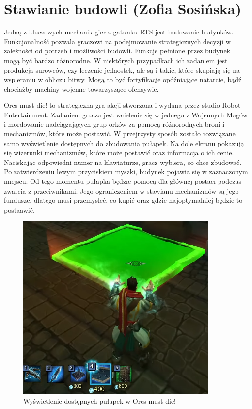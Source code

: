 \section{Stawianie budowli (Zofia Sosińska)}\label{chap:omd}
Jedną z kluczowych mechanik gier z gatunku RTS jest budowanie budynków. Funkcjonalność pozwala graczowi 
na podejmowanie strategicznych decyzji w zależności od potrzeb i możliwości budowli. Funkcje pełnione 
przez budynek mogą być bardzo różnorodne. W niektórych przypadkach ich zadaniem jest produkcja surowców, czy leczenie
jednostek, ale są i takie, które skupiają się na wspieraniu w obliczu bitwy. Mogą to być fortyfikacje opóźniające natarcie,
bądź chociażby machiny wojenne towarzyszące ofensywie.

Orcs must die! to strategiczna gra akcji stworzona i wydana przez studio Robot Entertainment. Zadaniem gracza jest wcielenie się
w jednego z  Wojennych Magów i mordowanie nadciągających grup orków za pomocą różnorodnych broni i mechanizmów, które może postawić.
W przejrzysty sposób zostało rozwiązane samo wyświetlenie dostępnych do zbudowania pułapek. Na dole ekranu pokazują się wizerunki mechanizmów,
które może postawić oraz informacja o ich cenie. Naciskając odpowiedni numer na klawiaturze, gracz wybiera, co chce zbudować. Po zatwierdzeniu lewym przyciskiem myszki,
budynek pojawia się w zaznaczonym miejscu. Od tego momentu pułapka będzie pomocą dla głównej postaci podczas zwarcia z przeciwnikami.
Jego ograniczeniem w stawianu mechanizmów są jego fundusze, dlatego musi przemysleć, co kupić oraz gdzie najoptymalniej będzie to postaawić.

\begin{figure}[h!tbp]
    \centering
    \includegraphics[width=0.9\textwidth]{images/ui/buoildingsOrcs.png}
    \caption{Wyświetlenie dostępnych pułapek w Orcs must die!}\label{fig:Orcs}
\end{figure}